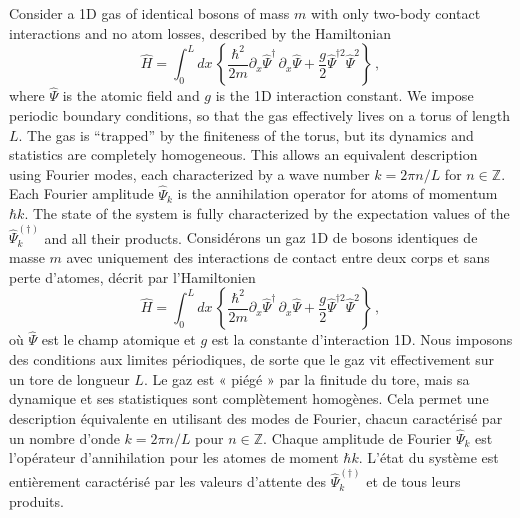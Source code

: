 \documentclass[aps,prd,notitlepage,amsfonts,amssymb,amsmath,nofootinbib,superscriptaddress,longbibliography]{revtex4-2}
\newcommand{\trad}[1]{\textcolor{tradcolor}{#1}}
\begin{document}
Consider a 1D gas of identical bosons of mass $m$ with only two-body contact interactions and no atom losses, described by the Hamiltonian
\begin{equation}
\hat{H} = \int_{0}^{L} dx \, \left\{ \frac{\hbar^{2}}{2m} \partial_{x}\hat{\Psi}^{\dagger} \, \partial_{x}\hat{\Psi} + \frac{g}{2} \hat{\Psi}^{\dagger 2} \hat{\Psi}^{2} \right\} \, ,
\label{eq:Hamiltonian_full}
\end{equation}
where $\hat{\Psi}$ is the atomic field and $g$ is the 1D interaction constant.
We impose periodic boundary conditions, so that the gas effectively lives on a torus of length $L$.  
The gas is ``trapped'' by the finiteness of the torus, but its dynamics and statistics are completely homogeneous. This allows an equivalent description using Fourier modes, each characterized by a wave number $k = 2\pi n/L$ for $n \in \mathbb{Z}$.
Each Fourier amplitude $\hat{\Psi}_{k}$ is the annihilation operator for atoms of momentum $\hbar k$.  The state of the system is fully characterized by the expectation values of the $\hat{\Psi}_{k}^{(\dagger)}$ and all their products.
\trad{Considérons un gaz 1D de bosons identiques de masse \( m \) avec uniquement des interactions de contact entre deux corps et sans perte d'atomes, décrit par l'Hamiltonien
\begin{equation*}
\hat{H} = \int_{0}^{L} dx \, \left\{ \frac{\hbar^{2}}{2m} \partial_{x}\hat{\Psi}^{\dagger} \, \partial_{x}\hat{\Psi} + \frac{g}{2} \hat{\Psi}^{\dagger 2} \hat{\Psi}^{2} \right\} \, ,%
\end{equation*}
où \(\hat{\Psi}\) est le champ atomique et \( g \) est la constante d'interaction 1D. Nous imposons des conditions aux limites périodiques, de sorte que le gaz vit effectivement sur un tore de longueur \( L \). Le gaz est « piégé » par la finitude du tore, mais sa dynamique et ses statistiques sont complètement homogènes. Cela permet une description équivalente en utilisant des modes de Fourier, chacun caractérisé par un nombre d'onde \( k = 2\pi n / L \) pour \( n \in \mathbb{Z} \). Chaque amplitude de Fourier \(\hat{\Psi}_{k}\) est l'opérateur d'annihilation pour les atomes de moment \(\hbar k\). L'état du système est entièrement caractérisé par les valeurs d'attente des \(\hat{\Psi}_{k}^{(\dagger)}\) et de tous leurs produits.
}
\end{document}
